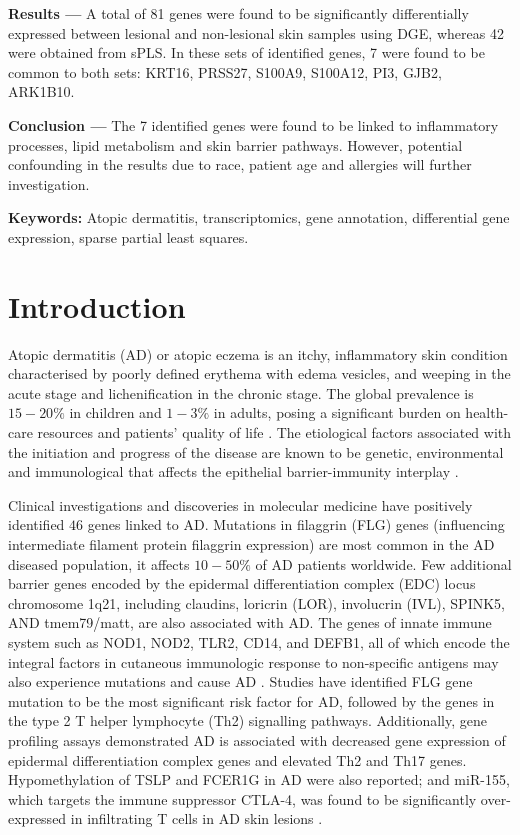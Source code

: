 \documentclass[journal, a4paper]{IEEEtran}
\begin{document}
\textbf{Results ---} A total of 81 genes were found to be significantly differentially expressed between lesional and non-lesional skin samples using DGE, whereas 42 were obtained from sPLS. In these sets of identified genes, 7 were found to be common to both sets: KRT16, PRSS27, S100A9, S100A12, PI3, GJB2, ARK1B10.

\textbf{Conclusion ---} The 7 identified genes were found to be linked to inflammatory processes, lipid metabolism and skin barrier pathways. However, potential confounding in the results due to race, patient age and allergies will further investigation. 

\textbf{Keywords:} Atopic dermatitis, transcriptomics, gene annotation, differential gene expression, sparse partial least squares.

\section{\textbf{Introduction}}

Atopic dermatitis (AD) or atopic eczema is an itchy, inflammatory skin condition characterised by poorly defined erythema with edema vesicles, and weeping in the acute stage and lichenification in the chronic stage. The global prevalence is $15-20 \%$ in children and $1-3\%$ in adults, posing a significant burden on health-care resources and patients’ quality of life \cite{nutten2015atopic}. The etiological factors associated with the initiation and progress of the disease are known to be genetic, environmental and immunological that affects the epithelial barrier-immunity interplay \cite{peng2015pathogenesis}.

Clinical investigations and discoveries in molecular medicine have positively identified $46$ genes linked to AD. Mutations in filaggrin (FLG) genes (influencing intermediate filament protein filaggrin expression) are most common in the AD diseased population, it affects $10-50\%$ of AD patients worldwide. Few additional barrier genes encoded by the epidermal differentiation complex (EDC) locus chromosome 1q21, including claudins, loricrin (LOR), involucrin (IVL), SPINK5, AND tmem79/matt, are also associated with AD. The genes of innate immune system such as NOD1, NOD2, TLR2, CD14, and DEFB1, all of which encode the integral factors in cutaneous immunologic response to non-specific antigens may also experience mutations and cause AD \cite{guttman2017atopic}. Studies have identified FLG gene mutation to be the most significant risk factor for AD, followed by the genes in the type 2 T helper lymphocyte (Th2) signalling pathways. Additionally, gene profiling assays demonstrated AD is associated with decreased gene expression of epidermal differentiation complex genes and elevated Th2 and Th17 genes. Hypomethylation of TSLP and FCER1G in AD were also reported; and miR-155, which targets the immune suppressor CTLA-4, was found to be significantly over-expressed in infiltrating T cells in AD skin lesions \cite{guttman2017atopic, bin2016genetic}.\\
\end{document}
